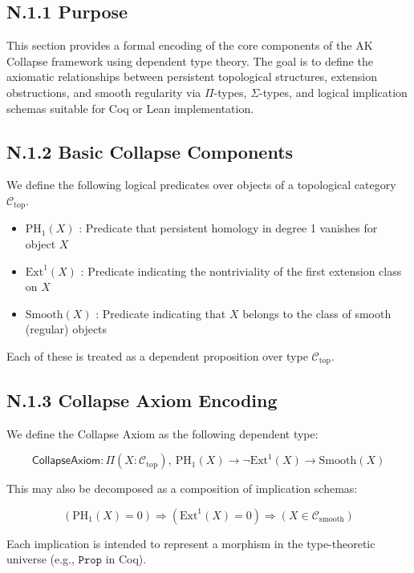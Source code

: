 \documentclass[11pt]{article}
\begin{document}
\subsection*{N.1.1 Purpose}

This section provides a formal encoding of the core components of the AK Collapse framework using dependent type theory.  
The goal is to define the axiomatic relationships between persistent topological structures, extension obstructions,  
and smooth regularity via $\Pi$-types, $\Sigma$-types, and logical implication schemas suitable for Coq or Lean implementation.

\subsection*{N.1.2 Basic Collapse Components}

We define the following logical predicates over objects of a topological category $\mathcal{C}_{\mathrm{top}}$.

\begin{itemize}
  \item $\mathrm{PH}_1(X)$ : Predicate that persistent homology in degree 1 vanishes for object $X$
  \item $\mathrm{Ext}^1(X)$ : Predicate indicating the nontriviality of the first extension class on $X$
  \item $\mathrm{Smooth}(X)$ : Predicate indicating that $X$ belongs to the class of smooth (regular) objects
\end{itemize}

Each of these is treated as a dependent proposition over type $\mathcal{C}_{\mathrm{top}}$.

\subsection*{N.1.3 Collapse Axiom Encoding}

We define the Collapse Axiom as the following dependent type:

\[
\textsf{CollapseAxiom} : \Pi (X : \mathcal{C}_{\mathrm{top}}),\ 
\mathrm{PH}_1(X) \rightarrow \neg \mathrm{Ext}^1(X) \rightarrow \mathrm{Smooth}(X)
\]

This may also be decomposed as a composition of implication schemas:

\[
(\mathrm{PH}_1(X) = 0) \Rightarrow (\mathrm{Ext}^1(X) = 0) \Rightarrow (X \in \mathcal{C}_{\mathrm{smooth}})
\]

Each implication is intended to represent a morphism in the type-theoretic universe (e.g., $\texttt{Prop}$ in Coq).
\end{document}
